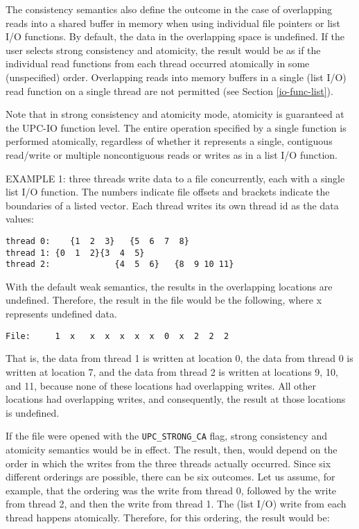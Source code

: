 \np The consistency semantics also define the outcome in the case of overlapping
reads into a shared buffer in memory when using individual file pointers or
list I/O functions. By default, the data in the overlapping space is
undefined. If the user selects strong consistency and atomicity, the result would be as
if the individual read functions from each thread occurred atomically in
some (unspecified) order. Overlapping reads into memory buffers in a single
(list I/O) read function on a single thread are not permitted (see Section
\ref{io-func-list}).

\np Note that in strong consistency and atomicity mode, atomicity is guaranteed at the UPC-IO function
level. The entire operation specified by a single function is performed
atomically, regardless of whether it represents a single, contiguous
read/write or multiple noncontiguous reads or writes as in a list I/O
function.

\np EXAMPLE 1:  three threads write data to a file
concurrently, each with a single list I/O function. The numbers indicate
file offsets and brackets indicate the boundaries of a listed vector. Each
thread writes its own thread id as the data values:

\begin{verbatim}
thread 0:    {1  2  3}   {5  6  7  8}
thread 1: {0  1  2}{3  4  5}
thread 2:             {4  5  6}   {8  9 10 11}
\end{verbatim}

\np With the default weak semantics, the results in the overlapping locations
are undefined. Therefore, the result in the file would be the following,
where x represents undefined data.

\begin{verbatim}
File:     1  x   x  x  x  x  x  0  x  2  2  2
\end{verbatim}
\np That is, the data from thread 1 is written at location 0, the data from
thread 0 is written at location 7, and the data from thread 2 is written at
locations 9, 10, and 11, because none of these locations had overlapping
writes. All other locations had overlapping writes, and consequently, the
result at those locations is undefined.

\np If the file were opened with the {\tt UPC\_STRONG\_CA} flag, strong
consistency and atomicity semantics would be
in effect. The result, then, would depend on the order in which the writes
from the three threads actually occurred. Since six different orderings are
possible, there can be six outcomes. Let us assume, for example, that the
ordering was the write from thread 0, followed by the write from thread 2,
and then the write from thread 1. The (list I/O) write from each thread
happens atomically. Therefore, for this ordering, the result would be:

